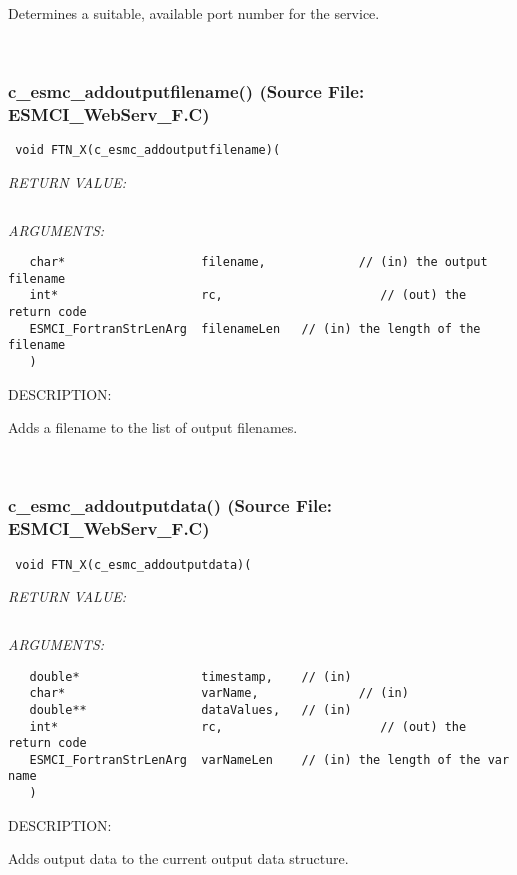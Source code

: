       Determines a suitable, available port number for the service.
   
 
\mbox{}\hrulefill\
 
\subsubsection{c\_esmc\_addoutputfilename() (Source File: ESMCI\_WebServ\_F.C)}


  
\begin{verbatim} void FTN_X(c_esmc_addoutputfilename)(\end{verbatim}{\em RETURN VALUE:}
\begin{verbatim} \end{verbatim}{\em ARGUMENTS:}
\begin{verbatim}   char*                   filename,             // (in) the output filename
   int*                    rc,                      // (out) the return code
   ESMCI_FortranStrLenArg  filenameLen   // (in) the length of the filename
   )\end{verbatim}
{\sf DESCRIPTION:\\ }


      Adds a filename to the list of output filenames.
   
 
\mbox{}\hrulefill\
 
\subsubsection{c\_esmc\_addoutputdata() (Source File: ESMCI\_WebServ\_F.C)}


  
\begin{verbatim} void FTN_X(c_esmc_addoutputdata)(\end{verbatim}{\em RETURN VALUE:}
\begin{verbatim} \end{verbatim}{\em ARGUMENTS:}
\begin{verbatim}   double*                 timestamp,    // (in)
   char*                   varName,              // (in)
   double**                dataValues,   // (in)
   int*                    rc,                      // (out) the return code
   ESMCI_FortranStrLenArg  varNameLen    // (in) the length of the var name
   )\end{verbatim}
{\sf DESCRIPTION:\\ }


      Adds output data to the current output data structure.
  
\setlength{\parskip}{\oldparskip}
\setlength{\parindent}{\oldparindent}
\setlength{\baselineskip}{\oldbaselineskip}
